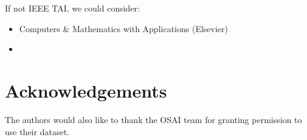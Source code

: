 \documentclass[journal]{IEEEtai}
\begin{document}
If not IEEE TAI, we could consider:
\begin{itemize}
    \item{Computers \& Mathematics with Applications (Elsevier)}
    \item{}
\end{itemize}
\fi










\section*{Acknowledgements}
The authors would also like to thank the OSAI team for granting permission to use their dataset.



\end{document}
